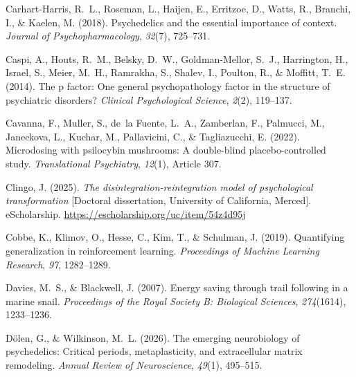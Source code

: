 \documentclass[12pt,fleqn]{article}
\begin{document}
\begin{thebibliography}{}
  Carhart-Harris, R.~L., Roseman, L., Haijen, E., Erritzoe, D., Watts, R., Branchi, I., \& Kaelen, M. (2018).
  Psychedelics and the essential importance of context.
  \emph{Journal of Psychopharmacology}, \emph{32}(7), 725--731.

  Caspi, A., Houts, R.~M., Belsky, D.~W., Goldman-Mellor, S.~J., Harrington, H., Israel, S., Meier, M.~H., Ramrakha, S., Shalev, I., Poulton, R., \& Moffitt, T.~E. (2014).
  The p factor: One general psychopathology factor in the structure of psychiatric disorders?
  \emph{Clinical Psychological Science}, \emph{2}(2), 119--137.

  Cavanna, F., Muller, S., de~la Fuente, L.~A., Zamberlan, F., Palmucci, M., Janeckova, L., Kuchar, M., Pallavicini, C., \& Tagliazucchi, E. (2022).
  Microdosing with psilocybin mushrooms: A double-blind placebo-controlled study.
  \emph{Translational Psychiatry}, \emph{12}(1), Article 307.

  Clingo, J. (2025).
  \emph{The disintegration-reintegration model of psychological transformation}
  [Doctoral dissertation, University of California, Merced]. eScholarship.
  \url{https://escholarship.org/uc/item/54z4d95j}

  Cobbe, K., Klimov, O., Hesse, C., Kim, T., \& Schulman, J. (2019).
  Quantifying generalization in reinforcement learning.
  \emph{Proceedings of Machine Learning Research}, \emph{97}, 1282--1289.

  Davies, M.~S., \& Blackwell, J. (2007).
  Energy saving through trail following in a marine snail.
  \emph{Proceedings of the Royal Society B: Biological Sciences}, \emph{274}(1614), 1233--1236.

  D\"olen, G., \& Wilkinson, M.~L. (2026).
  The emerging neurobiology of psychedelics: Critical periods, metaplasticity, and extracellular matrix remodeling.
  \emph{Annual Review of Neuroscience}, \emph{49}(1), 495--515.


\end{thebibliography}
\end{document}
